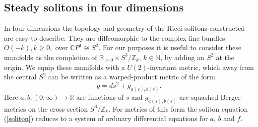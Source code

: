 \documentclass{amsart}
\theoremstyle{definition}
\theoremstyle{remark}
\numberwithin{equation}{section}
\newcommand{\R}{\mathbb{R}}  %
\newcommand{\N}{\mathbb{N}}
\begin{document}
\subsection{Steady solitons in four dimensions}
In four dimensions the topology and geometry of the Ricci solitons constructed are easy to describe: They are diffeomorphic to the complex line bundles $O(-k), k \geq 0,$ over $\mathbb{C}P^1 \cong S^2$. For our purposes it is useful to consider these manifolds as the completion of $\R_{>0} \times S^3/\mathbb{Z}_k$, $k \in \N$, by adding an $S^2$ at the origin. We equip these manifolds with a $U(2)$-invariant metric, which away from the central $S^2$ can be written as a warped-product metric of the form  
\begin{equation}
\label{U2-inv-metric} 
g = ds^2 + g_{a(s),b(s)}.
\end{equation} 
Here $a,b : (0,\infty) \rightarrow \R$ are functions of $s$ and $g_{a(s),b(s)}$ are squashed Berger metrics on the cross-section $S^3/\mathbb{Z}_k$. For metrics of this form the soliton equation (\ref{soliton}) reduces to a system of ordinary differential equations for $a$, $b$ and $f$.
 
\end{document}
